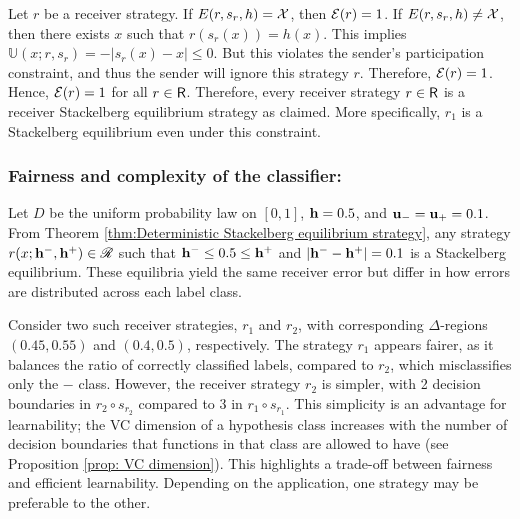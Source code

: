 Let $r$ be a receiver strategy. If $E(r, s_r, h) = \mathcal{X}$, then $\mathcal{E}(r) = 1$. If $E(r, s_r, h) \neq \mathcal{X}$, then there exists $x$ such that $r(s_r(x)) = h(x)$. This implies $\mathbb{U}(x; r, s_r) = -|s_r(x) - x| \leq 0$. But this violates the sender's participation constraint, and thus the sender will ignore this strategy $r$. Therefore, $\mathcal{E}(r) = 1$. Hence, $\mathcal{E}(r) = 1$ for all $r \in \mathsf{R}$. Therefore, every receiver strategy $r \in \mathsf{R}$ is a receiver Stackelberg equilibrium strategy as claimed. More specifically, $r_1$ is a Stackelberg equilibrium even under this constraint.


\subsubsection{Fairness and complexity of the classifier:}
Let $D$ be the uniform probability law on $[0,1]$, $\mathbf{h} = 0.5$, and $\mathbf{u_-} = \mathbf{u_+} = 0.1$. From Theorem \ref{thm:Deterministic Stackelberg equilibrium strategy}, any strategy $r(x; \mathbf{h^{-}}, \mathbf{h^{+}}) \in \mathscr{R}$ such that $\mathbf{h^{-}} \leq 0.5 \leq \mathbf{h^{+}}$ and $|\mathbf{h^{-}} - \mathbf{h^{+}}| = 0.1$ is a Stackelberg equilibrium. These equilibria yield the same receiver error but differ in how errors are distributed across each label class.

Consider two such receiver strategies, $r_1$ and $r_2$, with 
corresponding $\Delta$-regions $(0.45, 0.55)$ and $(0.4, 0.5)$, 
respectively. The strategy $r_1$ appears fairer, as it balances 
the ratio of correctly classified labels, compared to $r_2$, 
which misclassifies only the $-$ class. However, the receiver 
strategy $r_2$ is simpler, with 2 decision boundaries in 
$r_2 \circ s_{r_2}$ compared to 3 in $r_1 \circ s_{r_1}$. 
This simplicity is an advantage for learnability; 
the VC dimension of a hypothesis class increases with the number of decision 
boundaries that functions in that class are allowed to have
(see Proposition \ref{prop: VC dimension}). This 
highlights a trade-off between fairness and 
efficient learnability. Depending on the 
application, one strategy may be preferable to the other.

